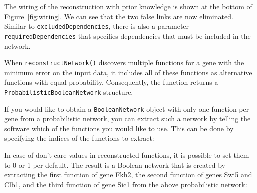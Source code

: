 \documentclass[a4paper]{article}
\begin{document}
The wiring of the reconstruction with prior knowledge is shown at the bottom of Figure~\ref{fig:wiring}. We can see that the two false links are now eliminated. Similar to \texttt{excludedDependencies}, there is also a parameter \texttt{requiredDependencies} that specifies dependencies that must be included in the network.

When \texttt{reconstructNetwork()} discovers multiple functions for a gene with the minimum error on the input data, it includes all of these functions as alternative functions with equal probability. Consequently, the function returns a \texttt{ProbabilisticBooleanNetwork} structure.

If you would like to obtain a \texttt{BooleanNetwork} object with only one function per gene from a probabilistic network, you can extract such a network by telling the software which of the functions you would like to use. This can be done by specifying the indices of the functions to extract:
\begin{knitrout}
\color{fgcolor}\begin{kframe}
\begin{alltt}
 \hlkwb{<-} \hlopt{$}
\hlstd{=}\hlstd{,} \hlstd{=}\hlstd{)}
 \hlkwb{<-} \hlstd{(}\hlstd{,}\hlstd{,}\hlstd{,}\hlstd{)} 
 \hlkwb{<-} \hlstd{(}\hlopt{$} \hlstd{(}\hlstd{)}  \hlopt{$}\hlopt{$} \hlopt{== -}\hlstd{)))} 
 \hlkwb{<-} \hlopt{$}
 \hlkwb{<-}   
\end{alltt}
\end{kframe}
\end{knitrout}
In case of don't care values in reconstructed functions, it is possible to set them to 0 or 1 per default. The result is a Boolean network that is created by extracting the first function of gene Fkh2, the second function of genes Swi5 and Clb1, and the third function of gene Sic1 from the above probabilistic network:
\end{document}
